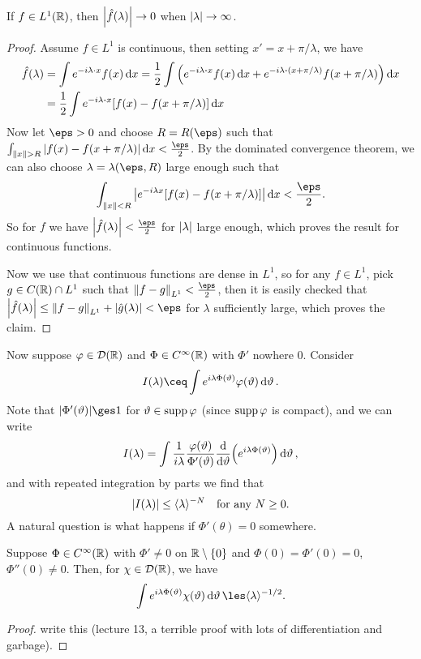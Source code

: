 \begin{lemma}
	If $f \in L^1(\mathbb R)$, then $\abs{\hat f(\lambda)} \to 0$ when $\abs{\lambda} \to\infty$. 
\end{lemma}
\begin{proof}
	Assume $f \in L^1$ is continuous, then setting $x' = x + \pi/\lambda$, we have
	\begin{align*}
		\hat f(\lambda) &= \int e^{-i\lambda \cdot x} f(x) \dd{x} = \frac12\int \qty( e^{-i\lambda \vd x}f(x) \dd{x} + e^{-i\lambda \vd (x + \pi/\lambda)} f(x + \pi/\lambda))\dd{x} \\
		&= \frac12 \int e^{-i\lambda \vd x} \qty[ f(x) - f(x + \pi/\lambda)] \dd{x}
	\end{align*}
	Now let $\eps > 0$ and choose $R = R(\eps)$ such that $\int_{\norm{x}> R} \abs{f(x) - f(x + \pi/\lambda)} \dd{x} < \frac\eps2$.
	By the dominated convergence theorem, we can also choose $\lambda = \lambda(\eps, R)$ large enough such that
	\[
	\int_{\norm{x}< R} \abs{e^{-i\lambda x} \qty[f(x) - f(x + \pi/\lambda)]} \dd{x} < \frac\eps2. 
	\]  
	So for $f$ we have $\abs{\hat f(\lambda)} < \frac\eps2$ for $\abs{\lambda}$ large enough, which proves the result for continuous functions.
	
	Now we use that continuous functions are dense in $L^1$, so for any $f \in L^1$, pick $g \in C(\mathbb R) \cap L^1$ such that $\norm{f - g}_{L^1} < \frac\eps2$, then it is easily checked that $\abs{\hat f(\lambda)} \leq \norm{f - g}_{L^1} + \abs{\hat g(\lambda)} < \eps $ for $\lambda$ sufficiently large, which proves the claim. 
	
\end{proof}

Now suppose $\varphi \in \mathcal D(\mathbb R)$ and $\Phi \in C^\infty(\mathbb R)$ with $\Phi'$ nowhere 0. Consider
\[
I(\lambda) \ceq \int e^{i\lambda \Phi(\theta)} \phi(\theta) \dd{\theta}. 
\]
Note that $\abs{\Phi'(\theta)} \ges 1$ for $\vartheta \in \operatorname{supp}\varphi$ (since $\operatorname{supp}\varphi$ is compact), and we can write
\[
I(\lambda) = \int \frac1{i\lambda} \frac{\varphi(\vartheta)}{\Phi'(\vartheta)} \dv{\vartheta}\qty(e^{i\lambda \Phi(\vartheta)}) \dd{\vartheta},
\]
and with repeated integration by parts we find that
\[
\abs{I(\lambda)} \leq \langle\lambda\rangle^{-N} \quad\text{for any $N \geq 0$}. 
\]
A natural question is what happens if $\Phi'(\theta) = 0$ somewhere. 

\begin{lemma}
	Suppose $\Phi \in C^\infty(\mathbb R)$ with $\Phi' \neq 0$ on $\mathbb R \setminus \qty{0}$ and $\Phi(0) = \Phi'(0) = 0$, $\Phi''(0) \neq 0$. Then, for $\chi \in \mathcal D(\mathbb R)$, we have
	\[
	\int e^{i\lambda \Phi(\theta)} \chi(\theta) \dd{\theta} \les \ang{\lambda}^{-1/2}. 
	\]
\end{lemma}

\begin{proof}
	\TODO write this (lecture 13, a terrible proof with lots of differentiation and garbage). 
\end{proof}